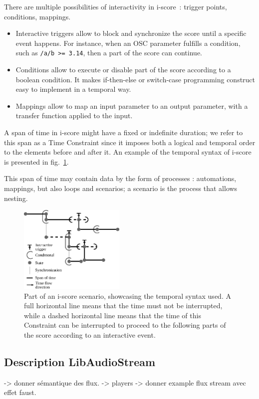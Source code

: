 \documentclass{article}
\begin{document}
There are multiple possibilities of interactivity in i-score~: trigger points, conditions, 
mappings.
\begin{itemize}
    \item Interactive triggers allow to block and synchronize the score until a specific event happens.
    For instance, when an OSC parameter fulfills a condition, such as \lstinline|/a/b >= 3.14|, then 
    a part of the score can continue.
    \item Conditions allow to execute or disable part of the score according to a boolean condition.
    It makes if-then-else or switch-case programming construct easy to implement in a temporal way.
    \item Mappings allow to map an input parameter to an output parameter, with a transfer function applied to the input.
\end{itemize}

A span of time in i-score might have a fixed or indefinite duration;
we refer to this span as a Time Constraint since it imposes both a logical and temporal order to the elements before and after it.
An example of the temporal syntax of i-score is presented in fig.~\ref{fig.iscore-example}.
 
This span of time may contain data by the form of processes : automations, mappings, but also loops and scenarios; a scenario is the process that allows nesting. 

\begin{figure}
	\centering
	\includegraphics[width=0.45\textwidth]{figures/iscore-example.eps}
	\caption{Part of an i-score scenario, showcasing the temporal syntax used. 
		A full horizontal line means that the time must not be interrupted, 
		while a dashed horizontal line means that the time of this Constraint can be interrupted to proceed 
		to the following parts of the score according to an interactive event.}
	\label{fig.iscore-example}
\end{figure}

\subsection{Description LibAudioStream}
-> donner sémantique des flux.
-> players
-> donner example flux stream avec effet faust.
\end{document}
